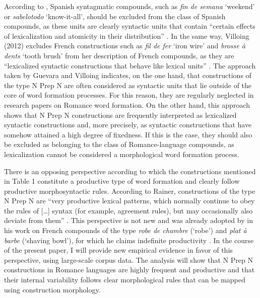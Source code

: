 \documentclass[output=paper]{langsci/langscibook}
\begin{document}
According to \citet{Guevara:2012}, Spanish syntagmatic compounds, such as \textit{fin de semana} `weekend' or \textit{sabelotodo} `know-it-all', should be excluded from the class of Spanish compounds, as these units are clearly syntactic units that contain “certain effects of lexicalization and atomicity in their distribution” \citep[180]{Guevara:2012}. In the same way, Villoing (2012) excludes French constructions such as \textit {fil de fer} `iron wire' and \textit {brosse à dents} `tooth brush' from her description of French compounds, as they are “lexicalized syntactic constructions that behave like lexical units” \citep[35]{Villoing:2012}. The approach taken by Guevara and Villoing indicates, on the one hand, that constructions of the type N Prep N are often considered as syntactic units that lie outside of the core of word formation processes. For this reason, they are regularly neglected in research papers on Romance word formation. On the other hand, this approach shows that N Prep N constructions are frequently interpreted as lexicalized syntactic constructions and, more precisely, as syntactic constructions that have somehow attained a high degree of fixedness. If this is the case, they should also be excluded as belonging to the class of Romance-language compounds, as lexicalization cannot be considered a morphological word formation process.

There is an opposing perspective according to which the constructions mentioned in Table 1 constitute a productive type of word formation and clearly follow productive morphosyntactic rules. According to Rainer, constructions of the type N Prep N are “very productive lexical patterns, which normally continue to obey the rules of […] syntax (for example, agreement rules), but may occasionally also deviate from them” \citep[2724]{Rainer:2016}. This perspective is not new and was already adopted by \citet{Benveniste:1974} in his work on French compounds of the type \textit {robe de chambre} (`robe') and \textit {plat à barbe} (`shaving bowl'), for which he claims indefinite productivity \citep[172]{Benveniste:1974}. In the course of the present paper, I will provide new empirical evidence in favor of this perspective, using large-scale corpus data. The analysis will show that N Prep N constructions in Romance languages are highly frequent and productive and that their internal variability follows clear morphological rules that can be mapped using construction morphology.\\
\end{document}
